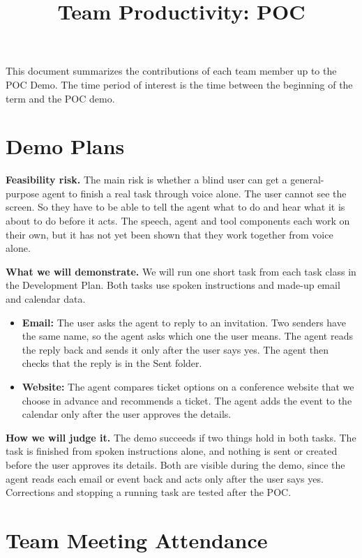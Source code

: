 \documentclass{article}
\title{Team Productivity: POC\\\progname}
\author{\authname}
\date{}
\begin{document}
\maketitle

This document summarizes the contributions of each team member up to the POC
Demo.  The time period of interest is the time between the beginning of the term
and the POC demo.


\section{Demo Plans}

\textbf{Feasibility risk.} The main risk is whether a blind user can get a
general-purpose agent to finish a real task through voice alone. The user cannot
see the screen. So they have to be able to tell the agent what to do and hear
what it is about to do before it acts. The speech, agent and tool components each
work on their own, but it has not yet been shown that they work together from
voice alone.

\textbf{What we will demonstrate.} We will run one short task from each task
class in the Development Plan. Both tasks use spoken instructions and made-up
email and calendar data.
\begin{itemize}
\item \textbf{Email:} The user asks the agent to reply to an invitation. Two
senders have the same name, so the agent asks which one the user means. The
agent reads the reply back and sends it only after the user says yes. The agent
then checks that the reply is in the Sent folder.
\item \textbf{Website:} The agent compares ticket options on a conference website
that we choose in advance and recommends a ticket.
The agent adds the event to the calendar only after the user approves the
details.
\end{itemize}

\textbf{How we will judge it.} The demo succeeds if two things hold in both
tasks. The task is finished from spoken instructions alone, and nothing is sent
or created before the user approves its details. Both are visible during the demo, since
the agent reads each email or event back and acts only after the user says yes.
Corrections and stopping a running task are tested after the POC.

\section{Team Meeting Attendance}
\end{document}
